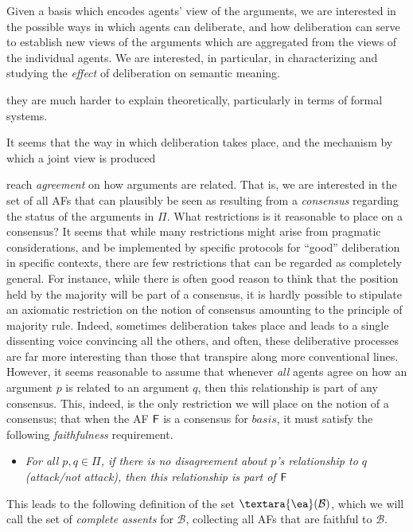 \documentclass{article}
\newcommand{\cons}[1]{{\textara{\ea}}(#1)}
\newcommand{\af}{{\sf F}}
\newcommand{\basis}{basis }
\newcommand{\views}{\mathcal B}
\begin{document}
Given a basis which encodes agents' view of the arguments, we are interested in the possible ways in which agents can deliberate, and how deliberation can serve to establish new views of the arguments which are aggregated from the views of the individual agents.  We are interested, in particular, in characterizing and studying the \emph{effect} of deliberation on semantic meaning. 

 they are much harder to explain theoretically, particularly in terms of formal systems. 

 It seems that the way in which deliberation takes place, and the mechanism by which a joint view is produced

 reach \emph{agreement} on how arguments are related. That is, we are interested in the set of all AFs that can plausibly be seen as resulting from a \emph{consensus} regarding the status of the arguments in $\Pi$. What restrictions is it reasonable to place on a consensus? It seems that while many restrictions might arise from pragmatic considerations, and be implemented by specific protocols for ``good'' deliberation in specific contexts, there are few restrictions that can be regarded as completely general. For instance, while there is often good reason to think that the position held by the majority will be part of a consensus, it is hardly possible to stipulate an axiomatic restriction on the notion of consensus amounting to the principle of majority rule. Indeed, sometimes deliberation takes place and leads to a single dissenting voice convincing all the others, and often, these deliberative processes are far more interesting than those that transpire along more conventional lines. However, it seems reasonable to assume that whenever \emph{all} agents agree on how an argument $p$ is related to an argument $q$, then this relationship is part of any consensus. This, indeed, is the only restriction we will place on the notion of a consensus; that when the AF $\af$ is a consensus for $\basis$, it must satisfy the following \emph{faithfulness} requirement.

\begin{itemize}
\item \emph{For all $p,q \in \Pi$, if there is no disagreement about $p$'s relationship to $q$ (attack/not attack), then this relationship is part of $\af$}
\end{itemize}

This leads to the following definition of the set $\cons \views$, which we will call the set of \emph{complete assents} for $\views$, collecting all AFs that are faithful to $\views$.
\end{document}
